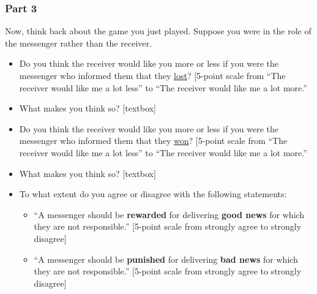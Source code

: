 \subsubsection*{Part 3}

Now, think back about the game you just played. Suppose you were in the role of
the messenger rather than the receiver.

\begin{itemize}
    \item Do you think the receiver would like you more or less if you
    were the messenger who informed them that they \underline{lost}? 
    [5-point scale from ``The receiver would like me a lot less'' to ``The
    receiver would like me a lot more.''
    \item What makes you think so? [textbox]
    \item Do you think the receiver would like you more or less if you
    were the messenger who informed them that they \underline{won}? [5-point
    scale from ``The receiver would like me a lot less'' to ``The receiver would
    like me a lot more.''
    \item What makes you think so? [textbox]
    \item To what extent do you agree or disagree with the following statements:
    \begin{itemize}
        \item ``A messenger should be \textbf{rewarded} for delivering \textbf{good news} for
        which they are not responsible.'' [5-point scale from strongly agree to
        strongly disagree]
    \end{itemize}
    \begin{itemize}
    	\item ``A messenger should be \textbf{punished} for delivering \textbf{bad news} for which
    they are not responsible.'' [5-point scale from strongly agree to
    strongly disagree]
    \end{itemize}
\end{itemize}